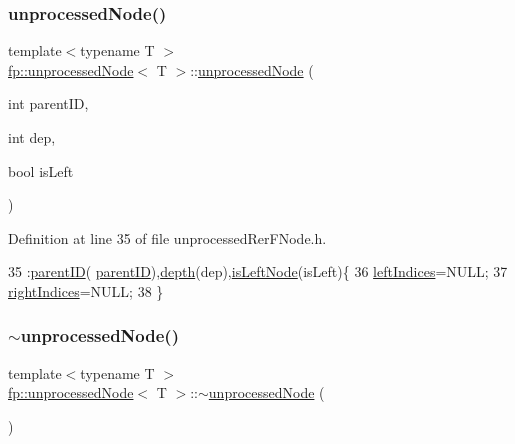 \subsubsection{\texorpdfstring{unprocessed\+Node()}{unprocessedNode()}\hspace{0.1cm}{\footnotesize\ttfamily [4/4]}}
{\footnotesize\ttfamily template$<$typename T $>$ \\
\hyperlink{classfp_1_1unprocessedNode}{fp\+::unprocessed\+Node}$<$ T $>$\+::\hyperlink{classfp_1_1unprocessedNode}{unprocessed\+Node} (\begin{DoxyParamCaption}\item[{int}]{parent\+ID,  }\item[{int}]{dep,  }\item[{bool}]{is\+Left }\end{DoxyParamCaption})\hspace{0.3cm}{\ttfamily [inline]}}



Definition at line 35 of file unprocessed\+Rer\+F\+Node.\+h.


\begin{DoxyCode}
35                                                                    :\hyperlink{classfp_1_1unprocessedNode_a74cb75f76c24622444e531a583b75c3d}{parentID}(
      \hyperlink{classfp_1_1unprocessedNode_a74cb75f76c24622444e531a583b75c3d}{parentID}),\hyperlink{classfp_1_1unprocessedNode_a22ebfbc35a57e2d30b81220c94f4d0d3}{depth}(dep),\hyperlink{classfp_1_1unprocessedNode_a81b74c36ed1ac15d367e135e2fa0ba3d}{isLeftNode}(isLeft)\{
36                     \hyperlink{classfp_1_1unprocessedNode_a8e39fa0144bbb78fd02d1973bd05b5f6}{leftIndices}=NULL;
37                     \hyperlink{classfp_1_1unprocessedNode_ac6886f626536370b1276374d4939291e}{rightIndices}=NULL;
38                 \}
\end{DoxyCode}
\mbox{\label{classfp_1_1unprocessedNode_a3242b54f6a1613c61ffa989b92501ab9}} 
\subsubsection{\texorpdfstring{$\sim$unprocessed\+Node()}{~unprocessedNode()}\hspace{0.1cm}{\footnotesize\ttfamily [2/2]}}
{\footnotesize\ttfamily template$<$typename T $>$ \\
\hyperlink{classfp_1_1unprocessedNode}{fp\+::unprocessed\+Node}$<$ T $>$\+::$\sim$\hyperlink{classfp_1_1unprocessedNode}{unprocessed\+Node} (\begin{DoxyParamCaption}{ }\end{DoxyParamCaption})\hspace{0.3cm}{\ttfamily [inline]}}



